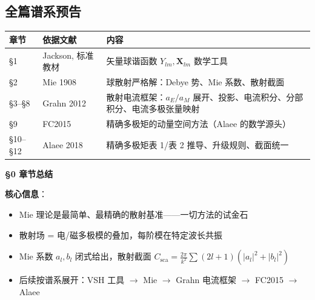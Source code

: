 \subsection{全篇谱系预告}

\begin{center}\small
\begin{tabular}{llp{6.5cm}}
\toprule
\textbf{章节} & \textbf{依据文献} & \textbf{内容} \\
\midrule
\S1 & Jackson, 标准教材 & 矢量球谐函数 $Y_{lm},\mathbf{X}_{lm}$ 数学工具 \\
\S2 & Mie 1908 & 球散射严格解：Debye 势、Mie 系数、散射截面 \\
\S3--\S8 & Grahn 2012 & 散射电流框架：$a_E/a_M$ 展开、投影、电流积分、分部积分、电流多极张量映射 \\
\S9 & FC2015 & 精确多极矩的动量空间方法（Alaee 的数学源头） \\
\S10--\S12 & Alaee 2018 & 精确多极矩表 1/表 2 推导、升级规则、截面统一 \\
\bottomrule
\end{tabular}
\end{center}

\begin{chaptersummary}

\textbf{\S0 章节总结}

\textbf{核心信息}：
\begin{itemize}
  \item Mie 理论是最简单、最精确的散射基准——一切方法的试金石
  \item 散射场 = 电/磁多极模的叠加，每阶模在特定波长共振
  \item Mie 系数 $a_l,b_l$ 闭式给出，散射截面 $C_{\text{sca}}=\frac{2\pi}{k^2}\sum(2l+1)(|a_l|^2+|b_l|^2)$
  \item 后续按谱系展开：VSH 工具 $\to$ Mie $\to$ Grahn 电流框架 $\to$ FC2015 $\to$ Alaee
\end{itemize}

\end{chaptersummary}

\newpage
